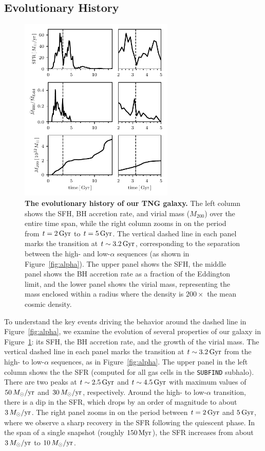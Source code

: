 \subsection{Evolutionary History}\label{ssec:evol}
\begin{figure}
  \centering
  \includegraphics[width=208.14452628pt]{ch4/392276_SFH_AGN_M200.pdf}
  \caption{\textbf{The evolutionary history of our TNG galaxy.} The left column shows the SFH, BH accretion rate, and virial mass ($M_{200}$) over the entire time span, while the right column zooms in on the period from $t=2\,\textrm{Gyr}$ to $t=5\,\textrm{Gyr}$. The vertical dashed line in each panel marks the transition at $t\sim3.2\,\textrm{Gyr}$, corresponding to the separation between the high- and low-$\alpha$ sequences (as shown in Figure~\ref{fig:alpha}). The upper panel shows the SFH, the middle panel shows the BH accretion rate as a fraction of the Eddington limit, and the lower panel shows the virial mass, representing the mass enclosed within a radius where the density is $200\times$ the mean cosmic density.}
  \label{fig:history}
\end{figure}

To understand the key events driving the behavior around the dashed line in Figure~\ref{fig:alpha}, we examine the evolution of several properties of our galaxy in Figure~\ref{fig:history}: its SFH, the BH accretion rate, and the growth of the virial mass. The vertical dashed line in each panel marks the transition at $t\sim3.2\,\textrm{Gyr}$ from the high- to low-$\alpha$ sequences, as in Figure~\ref{fig:alpha}. The upper panel in the left column shows the the SFR (computed for all gas cells in the \texttt{SUBFIND} subhalo). There are two peaks at $t\sim2.5\,\textrm{Gyr}$ and $t\sim4.5\,\textrm{Gyr}$ with maximum values of $50\,M_{\odot}/\textrm{yr}$ and $30\,M_{\odot}/\textrm{yr}$, respectively. Around the high- to low-$\alpha$ transition, there is a dip in the SFR, which drops by an order of magnitude to about $3\,M_{\odot}/\textrm{yr}$. The right panel zooms in on the period between $t=2\,\textrm{Gyr}$ and $5\,\textrm{Gyr}$, where we observe a sharp recovery in the SFR following the quiescent phase. In the span of a single snapshot (roughly $150\,\textrm{Myr}$), the SFR increases from about $3\,M_{\odot}/\textrm{yr}$ to $10\,M_{\odot}/\textrm{yr}$.

